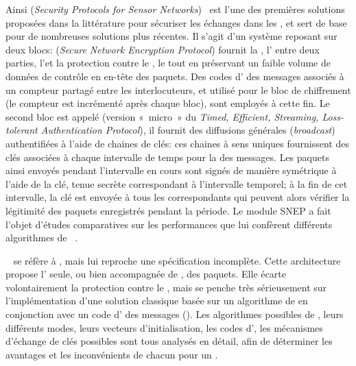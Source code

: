 Ainsi  (\textit{Security Protocols for Sensor Networks})~\cite{PSWCT02} est l'une des premières solutions proposées dans la littérature pour sécuriser les échanges dans les \rcs, et sert de base pour de nombreuses solutions plus récentes.
Il s'agit d'un système reposant sur deux blocs:  (\textit{Secure Network Encryption Protocol}) fournit la , l' entre deux parties, l'\integrite et la protection contre le , le tout en préservant un faible volume de données de contrôle en en-tête des paquets.
Des codes d' des messages associés à un compteur partagé entre les interlocuteurs, et utilisé pour le bloc de chiffrement (le compteur est incrémenté après chaque bloc), sont employés à cette fin.
Le second bloc est appelé  (version « micro » du \textit{Timed, Efficient, Streaming, Loss-tolerant Authentication Protocol}), il fournit des diffusions générales (\textit{broadcast}) authentifiées à l'aide de chaines de clés: ces chaines à sens uniques fournissent des clés associées à chaque intervalle de temps pour la  des messages.
Les paquets ainsi envoyés pendant l'intervalle en cours sont signés de manière symétrique à l'aide de la clé, tenue secrète correspondant à l'intervalle temporel; à la fin de cet intervalle, la clé est envoyée à tous les correspondants qui peuvent alors vérifier la légitimité des paquets enregistrés pendant la période.
Le module SNEP a fait l'objet d'études comparatives sur les performances que lui confèrent différents algorithmes de ~\cite{SS14-snep}.

~\cite{KSW04} se réfère à , mais lui reproche une spécification incomplète.
Cette architecture propose l' seule, ou bien accompagnée de , des paquets.
Elle écarte volontairement la protection contre le , mais se penche très sérieusement sur l'implémentation d'une solution classique basée sur un algorithme de  en conjonction avec un code d' des messages (\macc).
Les algorithmes possibles de , leurs différents modes, leurs vecteurs d'initialisation, les codes d', les mécanismes d'échange de clés possibles sont tous analysés en détail, afin de déterminer les avantages et les inconvénients de chacun pour un \rc.


